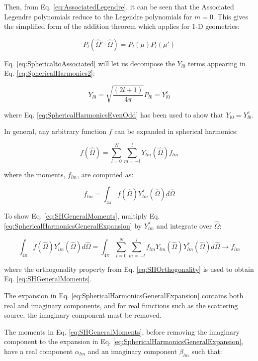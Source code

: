 \documentclass[10pt]{article}
\newcommand{\beq}{\begin{equation}}
\newcommand{\eeq}{\end{equation}}
\newcommand{\hO}{\hat{\Omega}}
\begin{document}
\begin{flushleft}
\begin{tcolorbox}[breakable]
Then, from Eq. \eqref{eq:AssociatedLegendre}, it can be seen that the Associated Legendre polynomials reduce to the Legendre polynomials for \(m=0\). This gives the simplified form of the addition theorem which applies for 1-D geometries:

\beq
\label{eq:AddSpherical1D}
P_l(\hO  '\cdot\hO  )=P_{l}(\mu)P_{l}(\mu')
\eeq

\end{tcolorbox}

Eq. \eqref{eq:SphericaltoAssociated} will let us decompose the \(Y_{l0}\) terms appearing in Eq. \eqref{eq:SphericalHarmonics2}:

\begin{equation}
Y_{l0}=\sqrt{\frac{(2l+1)}{4\pi}}P_{l0}= Y_{l0}^e
\end{equation}

where Eq. \eqref{eq:SphericalHarmonicsEvenOdd} has been used to show that \(Y_{l0}=Y_{l0}^e\).

In general, any arbitrary function \(f\) can be expanded in spherical harmonics:

\beq
\label{eq:SphericalHarmonicsGeneralExpansion}
f(\hO  )=\sum_{l=0}^{N}\sum_{m=-l}^{l}Y_{lm}(\hO  )f_{lm}
\eeq

where the moments, \(f_{lm}\), are computed as:

\beq
\label{eq:SHGeneralMoments}
f_{lm}=\int_{4\pi}^{}f(\hO  )Y_{lm}^{*}(\hO  )d\hO  
\eeq

\begin{tcolorbox}[breakable]
To show Eq. \eqref{eq:SHGeneralMoments}, multiply Eq. \eqref{eq:SphericalHarmonicsGeneralExpansion} by \(Y_{lm}^{*}\) and integrate over \(\hO  \):

\begin{equation}
\int_{4\pi}^{}f(\hO  )Y_{lm}^{*}(\hO  )d\hO  =\int_{4\pi}^{}\sum_{l=0}^{N}\sum_{m=-l}^{l}f_{lm}Y_{lm}(\hO  )Y_{lm}^{*}(\hO  )d\hO  \rightarrow f_{lm}
\end{equation}

where the orthogonality property from Eq. \eqref{eq:SHOrthogonality} is used to obtain Eq. \eqref{eq:SHGeneralMoments}.
\end{tcolorbox}

The expansion in Eq. \eqref{eq:SphericalHarmonicsGeneralExpansion} contains both real and imaginary components, and for real functions such as the scattering source, the imaginary component must be removed. 

\begin{tcolorbox}[breakable]
The moments in Eq. \eqref{eq:SHGeneralMoments}, before removing the imaginary component to the expansion in Eq. \eqref{eq:SphericalHarmonicsGeneralExpansion}, have a real component \(\alpha_{lm}\) and an imaginary component \(\beta_{lm}\) such that:


\end{tcolorbox}
\end{flushleft}
\end{document}
